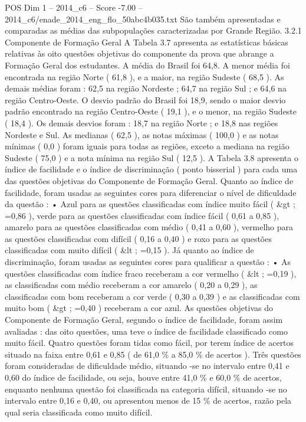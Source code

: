 \begin{textsample}{POS Dim 1 – 2014\_c6 – Score -7.00 – 2014\_c6/enade\_2014\_eng\_flo\_50abc4b035.txt}
São também apresentadas e comparadas as médias das subpopulações caracterizadas por Grande Região. 3.2.1 Componente de Formação Geral A Tabela 3.7 apresenta as estatísticas básicas relativas às oito questões objetivas do componente da prova que abrange a Formação Geral dos estudantes.
A média do Brasil foi 64,8.
A menor média foi encontrada na região Norte ( 61,8 ), e a maior, na região Sudeste ( 68,5 ).
As demais médias foram : 62,5 na região Nordeste ; 64,7 na região Sul ; e 64,6 na região Centro-Oeste.
O desvio padrão do Brasil foi 18,9, sendo o maior desvio padrão encontrado na região Centro-Oeste ( 19,1 ), e o menor, na região Sudeste ( 18,4 ).
Os demais desvios foram : 18,7 na região Norte ; e 18,8 nas regiões Nordeste e Sul.
As medianas ( 62,5 ), as notas máximas ( 100,0 ) e as notas mínimas ( 0,0 ) foram iguais para todas as regiões, exceto a mediana na região Sudeste ( 75,0 ) e a nota mínima na região Sul ( 12,5 ).
A Tabela 3.8 apresenta o índice de facilidade e o índice de discriminação ( ponto bisserial ) para cada uma das questões objetivas do Componente de Formação Geral.
Quanto ao índice de facilidade, foram usadas as seguintes cores para diferenciar o nível de dificuldade da questão : • Azul para as questões classificadas com índice muito fácil ( \&gt ; =0,86 ), verde para as questões classificadas com índice fácil ( 0,61 a 0,85 ), amarelo para as questões classificadas com médio ( 0,41 a 0,60 ), vermelho para as questões classificadas com difícil ( 0,16 a 0,40 ) e roxo para as questões classificadas com muito difícil ( \&lt ; =0,15 ).
Já quanto ao índice de discriminação, foram usadas as seguintes cores para qualificar a questão : • As questões classificadas com índice fraco receberam a cor vermelho ( \&lt ; =0,19 ), as classificadas com médio receberam a cor amarelo ( 0,20 a 0,29 ), as classificadas com bom receberam a cor verde ( 0,30 a 0,39 ) e as classificadas com muito bom ( \&gt ; =0,40 ) receberam a cor azul.
As questões objetivas do Componente de Formação Geral, segundo o índice de facilidade, foram assim avaliadas : das oito questões, uma teve o índice de facilidade classificado como muito fácil.
Quatro questões foram tidas como fácil, por terem índice de acertos situado na faixa entre 0,61 e 0,85 ( de 61,0 \% a 85,0 \% de acertos ).
Três questões foram consideradas de dificuldade médio, situando -se no intervalo entre 0,41 e 0,60 do índice de facilidade, ou seja, houve entre 41,0 \% e 60,0 \% de acertos, enquanto nenhuma questão foi classificada na categoria difícil, situando -se no intervalo entre 0,16 e 0,40, ou apresentou menos de 15 \% de acertos, razão pela qual seria classificada como muito difícil.

\end{textsample}
